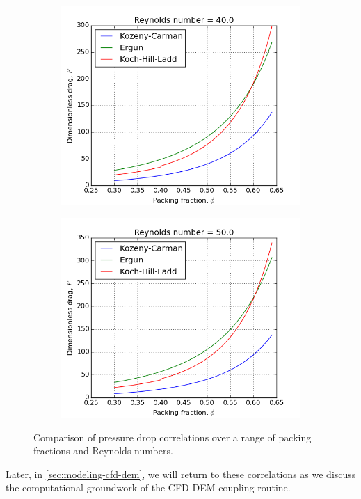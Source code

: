 \begin{figure}[!ht]
	\begin{subfigure}[b]{0.45\textwidth}
		\centering
		\includegraphics[width=\textwidth]{chapters/figures/pressure-drop-correlations/Re40.png}
	\end{subfigure}
	\begin{subfigure}[b]{0.45\textwidth}
		\centering
		\includegraphics[width=\textwidth]{chapters/figures/pressure-drop-correlations/Re50.png}
	\end{subfigure}
	\caption{Comparison of pressure drop correlations over a range of packing fractions and Reynolds numbers.}
\label{fig:p-drop-correlations}
\end{figure}

Later, in \cref{sec:modeling-cfd-dem}, we will return to these correlations as we discuss the computational groundwork of the CFD-DEM coupling routine.



\FloatBarrier
